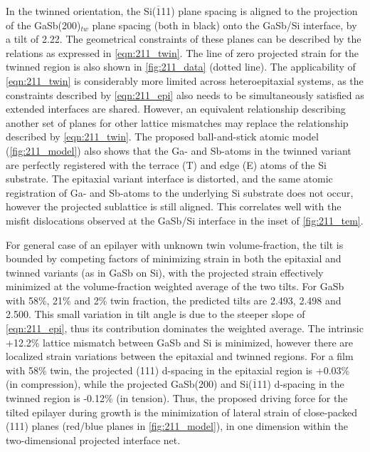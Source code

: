 In the twinned orientation, the Si(\(\overline{1}\)11) plane spacing is aligned to the projection of the GaSb(200)\(_{tw}\) plane spacing (both in black) onto the GaSb/Si interface, by a tilt of 2.22\degree{}.
The geometrical constraints of these planes can be described by the relations as expressed in \cref{eqn:211_twin}.
The line of zero projected strain for the twinned region is also shown in \cref{fig:211_data} (dotted line).
The applicability of \cref{eqn:211_twin} is considerably more limited across heteroepitaxial systems, as the constraints described by \cref{eqn:211_epi} also needs to be simultaneously satisfied as extended interfaces are shared.
However, an equivalent relationship describing another set of planes for other lattice mismatches may replace the relationship described by \cref{eqn:211_twin}.
The proposed ball-and-stick atomic model (\cref{fig:211_model}) also shows that the Ga- and Sb-atoms in the twinned variant are perfectly registered with the terrace (T) and edge (E) atoms of the Si substrate.
The epitaxial variant interface is distorted, and the same atomic registration of Ga- and Sb-atoms to the underlying Si substrate does not occur, however the projected sublattice is still aligned.
This correlates well with the misfit dislocations observed at the GaSb/Si interface in the inset of \cref{fig:211_tem}.

For general case of an epilayer with unknown twin volume-fraction, the tilt is bounded by competing factors of minimizing strain in both the epitaxial and twinned variants (as in GaSb on Si), with the projected strain effectively minimized at the volume-fraction weighted average of the two tilts.
For GaSb with 58\%, 21\% and 2\% twin fraction, the predicted tilts are 2.493\degree{}, 2.498\degree{} and 2.500\degree{}.
This small variation in tilt angle is due to the steeper slope of \cref{eqn:211_epi}, thus its contribution dominates the weighted average.
The intrinsic +12.2\% lattice mismatch between GaSb and Si is minimized, however there are localized strain variations between the epitaxial and twinned regions.
For a film with 58\% twin, the projected (111) d-spacing in the epitaxial region is +0.03\% (in compression), while the projected GaSb(200) and Si(\(\overline{1}\)11) d-spacing in the twinned region is -0.12\% (in tension).
Thus, the proposed driving force for the tilted epilayer during growth is the minimization of lateral strain of close-packed (111) planes (red/blue planes in \cref{fig:211_model}), in one dimension within the two-dimensional projected interface net.

